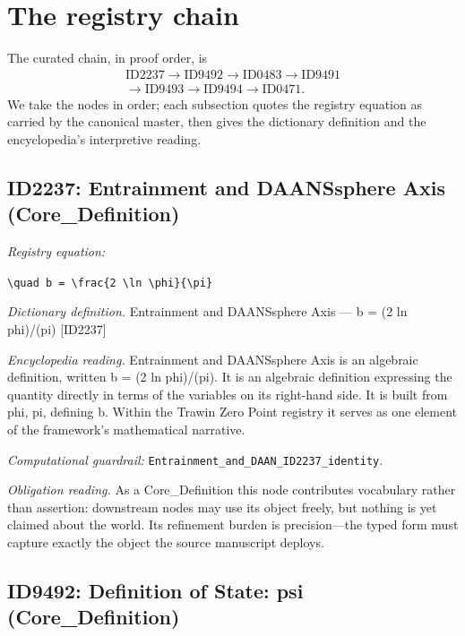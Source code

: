 \documentclass[11pt]{article}
\theoremstyle{remark}
\begin{document}
\section{The registry chain}
\label{sec:chain}

The curated chain, in proof order, is
\begin{equation*}
\begin{gathered}
\text{ID2237} \to \text{ID9492} \to \text{ID0483} \to \text{ID9491} \\
\to \text{ID9493} \to \text{ID9494} \to \text{ID0471}.
\end{gathered}
\end{equation*}
We take the nodes in order; each subsection quotes the registry equation as carried by the canonical master, then gives the dictionary definition and the encyclopedia's interpretive reading.

\subsection{ID2237: Entrainment and DAANSsphere Axis (Core\_Definition)}

\noindent\textit{Registry equation:}\par
{\small\texttt{\textbackslash{}quad b = \textbackslash{}frac\{2 \textbackslash{}ln \textbackslash{}phi\}\{\textbackslash{}pi\}}}\par\medskip
\noindent\textit{Dictionary definition.} Entrainment and DAANSsphere Axis --- b = (2 ln phi)/(pi) [ID2237]\par\medskip
\noindent\textit{Encyclopedia reading.} Entrainment and DAANSsphere Axis is an algebraic definition, written b = (2 ln phi)/(pi). It is an algebraic definition expressing the quantity directly in terms of the variables on its right-hand side. It is built from phi, pi, defining b. Within the Trawin Zero Point registry it serves as one element of the framework's mathematical narrative.
\par\medskip\noindent\textit{Computational guardrail:} \texttt{Entrainment\_and\_DAAN\_ID2237\_identity}.
\par\medskip\noindent\textit{Obligation reading.} As a Core\_Definition this node contributes vocabulary rather than assertion: downstream nodes may use its object freely, but nothing is yet claimed about the world. Its refinement burden is precision---the typed form must capture exactly the object the source manuscript deploys.

\subsection{ID9492: Definition of State: psi (Core\_Definition)}
\end{document}
